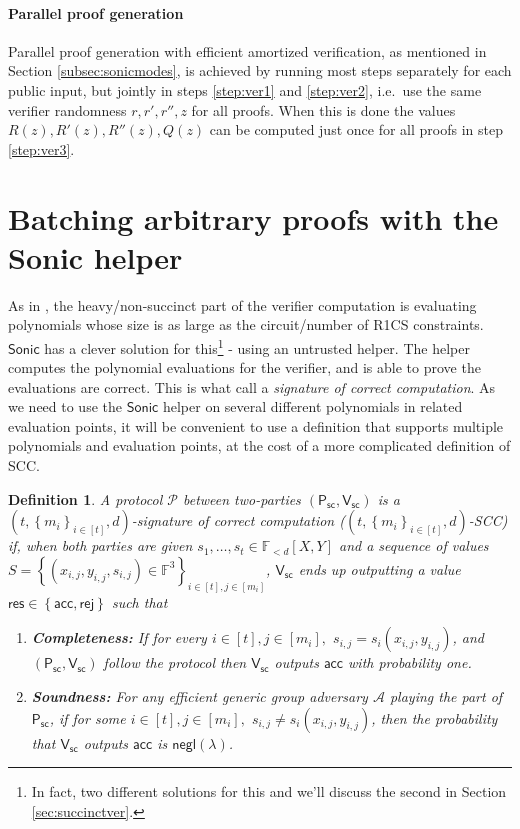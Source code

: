 \documentclass[11pt]{article}
\numberwithin{figure}{section} %
\newtheorem{dfn}[thm]{Definition}
\newcommand{\set}[1]{\ensuremath{\left\{#1\right\}}\xspace}
\newcommand{\F}{\ensuremath{\mathbb F}\xspace}
\newcommand{\adv}{\ensuremath{\mathcal A}\xspace}
\newcommand{\negl}{\ensuremath{\mathsf{negl}(\lambda)}\xspace}
\newcommand{\rej}{\ensuremath{\mathsf{rej}}\xspace}
\newcommand{\acc}{\ensuremath{\mathsf{acc}}\xspace}
\newcommand{\res}{\ensuremath{\mathsf{res}}\xspace}
\newcommand{\sett}[2]{\ensuremath{\set{#1}_{#2}}\xspace}
\newcommand{\prf}{\ensuremath{\pi}\xspace}
\newcommand{\sonic}{\ensuremath{\mathsf{Sonic}}\xspace}
\newcommand{\bivar}[1]{\ensuremath{\F_{< #1}[X,Y]}\xspace}
\newcommand{\prot}{\ensuremath{\mathscr{P}}\xspace}
\newcommand{\sigprv}{\ensuremath{\mathsf{P_{sc}}}\xspace}
\newcommand{\sigver}{\ensuremath{\mathsf{V_{sc}}}\xspace}
\begin{document}
\paragraph{Parallel proof generation}
Parallel proof generation with efficient amortized verification, as mentioned in Section \ref{subsec:sonicmodes}, is achieved by running most steps separately for each public input, but jointly in steps \ref{step:ver1} and \ref{step:ver2}, i.e.\ use the same verifier randomness $r,r',r'',z$ for all proofs. When this is done the values $R(z),R'(z),R''(z),Q(z)$ can be computed just once for all proofs in step \ref{step:ver3}.



\section{Batching arbitrary proofs with the Sonic helper}\label{sec:helpedver}
As in \cite{sonic}, the heavy/non-succinct part of the verifier computation is evaluating polynomials whose size is as large as the circuit/number of R1CS constraints.
\sonic has a clever solution for this\footnote{In fact, two different solutions for this and we'll discuss the second in Section \ref{sec:succinctver}.} - using an untrusted helper. The helper computes the polynomial evaluations for the verifier,
and is able to prove the evaluations are correct. This is what \cite{sonic} call a \emph{signature of correct computation}.
As we need to use the \sonic helper on several different polynomials in related evaluation points, it will be convenient to use a definition that supports multiple polynomials and evaluation points, at the cost of a more complicated definition of SCC.
\begin{dfn}\label{dfn:batchsigs}
  A protocol \prot between two-parties $(\sigprv,\sigver)$ is a  \emph{$(t,\sett{m_i}{i\in [t]},d)$-signature of correct computation} ($(t,\sett{m_i}{i\in [t]},d)$-SCC) if, when both parties are given $s_1,\ldots,s_t\in \bivar{d}$ and a sequence of values $S=\sett{(x_{i,j},y_{i,j},s_{i,j})\in \F^3}{i\in [t],j\in [m_i]}$, \sigver ends up outputting a value $\res\in \set{\acc,\rej}$ such that 
%   
\begin{enumerate}
 \item \textbf{Completeness:} If for every $i\in [t], j\in [m_i],$ $s_{i,j} = s_i(x_{i,j},y_{i,j})$,
 and $(\sigprv,\sigver)$ follow the protocol then
 $\sigver$ outputs \acc with probability one.
 \item \textbf{Soundness:} For any efficient generic group adversary \adv playing the part of \sigprv, if for some $i\in [t], j\in [m_i],$ $s_{i,j} \neq s_i(x_{i,j},y_{i,j})$, then the probability that \sigver outputs \acc is \negl.
\end{enumerate}

\end{dfn}
\end{document}
